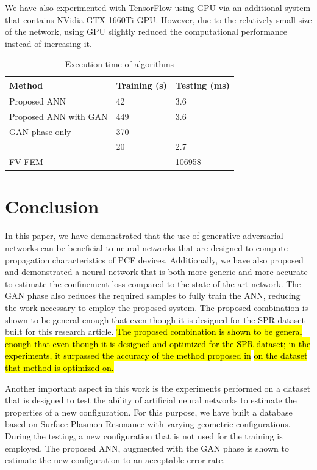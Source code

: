\documentclass[journal]{IEEEtran}
\begin{document}
We have also experimented with TensorFlow using GPU via an additional system that contains NVidia GTX 1660Ti GPU. However, due to the relatively small size of the network, using GPU slightly reduced the computational performance instead of increasing it.

\begin{table}
	\caption{Execution time of algorithms}
	\centering
	\begin{tabular}{l|l|l}
		Method    			  &  Training (s) & Testing (ms) \\\hline
		Proposed ANN 		  &  42 & 3.6 \\
		Proposed ANN with GAN & 449 & 3.6 \\
		GAN phase only        & 370 &  -  \\
		\cite{paper0}		  &  20 & 2.7 \\
		FV-FEM		   		  &  -  & 106958
	\end{tabular}
	\label{tbl:timing}
\end{table}

\section{Conclusion}
\label{sec:conc}

In this paper, we have demonstrated that the use of generative adversarial networks can be beneficial to neural networks that are designed to compute propagation characteristics of PCF devices. Additionally, we have also proposed and demonstrated a neural network that is both more generic and more accurate to estimate the confinement loss compared to the state-of-the-art network. The GAN phase also reduces the required samples to fully train the ANN, reducing the work necessary to employ the proposed system. The proposed combination is shown to be general enough that even though it is designed for the SPR dataset built for this research article. \hl{The proposed combination is shown to be general enough that even though it is designed and optimized for the SPR dataset; in the experiments, it surpassed the accuracy of the method proposed in }\cite{paper0}\hl{ on the dataset that method is optimized on.}

Another important aspect in this work is the experiments performed on a dataset that is designed to test the ability of artificial neural networks to estimate the properties of a new configuration. For this purpose, we have built a database based on Surface Plasmon Resonance with varying geometric configurations. During the testing, a new configuration that is not used for the training is employed. The proposed ANN, augmented with the GAN phase is shown to estimate the new configuration to an acceptable error rate.
\end{document}
